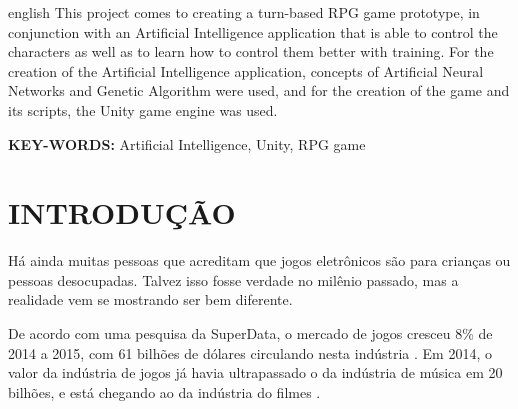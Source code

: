 \documentclass[
	12pt,					%
	openright,				%
	oneside,				%
	a4paper,				%
	bibjustif,				%
	chapter=TITLE,			%
	english,				%
	brazil,					%
	]{abntex2}
\begin{document}

\newpage %
\thispagestyle{empty} %
\begin{resumo}[Abstract]
	\begin{otherlanguage*}{english}
		\SingleSpacing
		This project comes to creating a turn-based RPG game prototype,
		in conjunction with an Artificial Intelligence application that is able to control the characters
		as well as to learn how to control them better with training.
		For the creation of the Artificial Intelligence application,
		concepts of Artificial Neural Networks and Genetic Algorithm were used,
		and for the creation of the game and its scripts,
		the Unity game engine was used.
		
		\vspace{\onelineskip}
		\textbf{KEY-WORDS:} Artificial Intelligence, Unity, RPG game
	\end{otherlanguage*}
\end{resumo}


\newpage %
\listoffigures*
\cleardoublepage

\newpage %
\thispagestyle{empty} %
\listoftables*
\cleardoublepage

\newpage %
\thispagestyle{empty} %
\tableofcontents*
\cleardoublepage

\textual
\newpage %
\chapter{INTRODUÇÃO}
	Há ainda muitas pessoas que acreditam que jogos eletrônicos são para crianças ou pessoas desocupadas.
	Talvez isso fosse verdade no milênio passado, mas a realidade vem se mostrando ser bem diferente.
	
	De acordo com uma pesquisa da SuperData,
	o mercado de jogos cresceu 8\% de 2014 a 2015,
	com 61 bilhões de dólares circulando nesta indústria \cite{cnbc}.
	Em 2014, o valor da indústria de jogos já havia ultrapassado o da indústria de música em 20 bilhões,
	e está chegando ao da indústria do filmes \cite{nytimes}.
	
\end{document}
